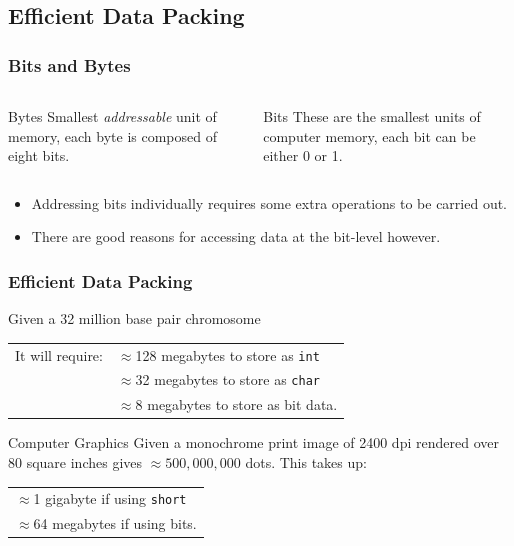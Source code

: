 \documentclass[smaller,handout,table]{beamer}
\begin{document}
\subsection{Efficient Data Packing}
\begin{frame}
\frametitle{Bits and Bytes}
\begin{columns}
\begin{column}{5cm}
\begin{block}{Bytes}
Smallest \emph{addressable} unit of memory, each byte is composed of eight bits.
\end{block}
\end{column}
\begin{column}{5cm}
\begin{block}{Bits}
These are the smallest units of computer memory, each bit can be either 0 or 1.
\end{block}
\end{column}
\end{columns}
\vspace{0.2in}
\begin{itemize}
\item Addressing bits individually requires some extra operations to be carried out.
\item There are good reasons for accessing data at the bit-level however.
\end{itemize}
\end{frame}

\begin{frame}
\frametitle{Efficient Data Packing}
\begin{block}{Given a 32 million base pair chromosome}
\begin{tabular}{l l}
It will require: &$\approx$128 megabytes to store as {\tt int}\\
&$\approx$32 megabytes to store as {\tt char}\\
&$\approx$8 megabytes to store as bit data.
\end{tabular}
\end{block}
\begin{block}{Computer Graphics}
Given a monochrome print image of 2400 dpi rendered over 80 square inches gives $\approx 500,000,000$ dots. This takes up:
\begin{center}
\begin{tabular}{l}
$\approx$1 gigabyte if using {\tt short}\\
$\approx$64 megabytes if using bits.
\end{tabular}
\end{center}
\end{block}
\end{frame}
\end{document}
